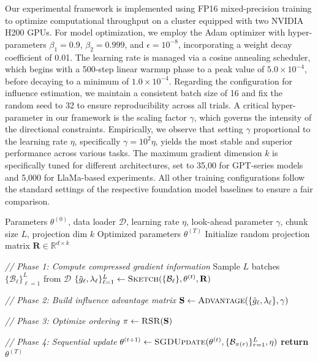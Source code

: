 Our experimental framework is implemented using FP16 mixed-precision training to optimize computational throughput on a cluster equipped with two NVIDIA H200 GPUs. For model optimization, we employ the Adam optimizer with hyper-parameters $\beta_1 = 0.9$, $\beta_2 = 0.999$, and $\epsilon = 10^{-8}$, incorporating a weight decay coefficient of 0.01. The learning rate is managed via a cosine annealing scheduler, which begins with a 500-step linear warmup phase to a peak value of $5.0 \times 10^{-4}$, before decaying to a minimum of $1.0 \times 10^{-4}$. Regarding the configuration for influence estimation, we maintain a consistent batch size of 16 and fix the random seed to 32 to ensure reproducibility across all trials. A critical hyper-parameter in our framework is the scaling factor $\gamma$, which governs the intensity of the directional constraints. 
Empirically, we observe that setting $\gamma$ proportional to the learning rate $\eta$, specifically $\gamma = 10^2 \eta$, yields the most stable and superior performance across various tasks. The maximum gradient dimension $k$ is specifically tuned for different architectures, set to 35,00 for GPT-series models and 5,000 for LlaMa-based experiments.  All other training configurations follow the standard settings of the respective foundation model baselines to ensure a fair comparison.

\begin{algorithm}
\caption{$D^{3}$: Influence-Aware Batch Scheduler}
\label{alg:d3_app}
\begin{algorithmic}[1]
\REQUIRE Parameters $\theta^{(0)}$, data loader $\mathcal{D}$, learning rate $\eta$, 
         look-ahead parameter $\gamma$, chunk size $L$, projection dim $k$
\ENSURE Optimized parameters $\theta^{(T)}$
\STATE Initialize random projection matrix $\mathbf{R} \in \mathbb{R}^{d \times k}$

    \item[] \textit{// Phase 1: Compute compressed gradient information}
    \STATE Sample $L$ batches $\{\mathcal{B}_\ell\}_{\ell=1}^L$ from $\mathcal{D}$
    \STATE $\{\tilde{g}_\ell, \lambda_\ell\}_{\ell=1}^L \gets \textsc{Sketch}(\{\mathcal{B}_\ell\}, \theta^{(t)}, \mathbf{R})$
    
    \item[] \textit{// Phase 2: Build influence advantage matrix}
    \STATE $\mathbf{S} \gets \textsc{Advantage}(\{\tilde{g}_\ell, \lambda_\ell\}, \gamma)$
    
    \item[] \textit{// Phase 3: Optimize ordering}
    \STATE $\pi \gets \textsc{RSR}(\mathbf{S})$
    
    \item[] \textit{// Phase 4: Sequential update}
    \STATE $\theta^{(t+1)} \gets \textsc{SGDUpdate}(\theta^{(t)}, \{\mathcal{B}_{\pi(r)}\}_{r=1}^L, \eta)$
\ENDFOR
\STATE \textbf{return} $\theta^{(T)}$
\end{algorithmic}
\end{algorithm}

